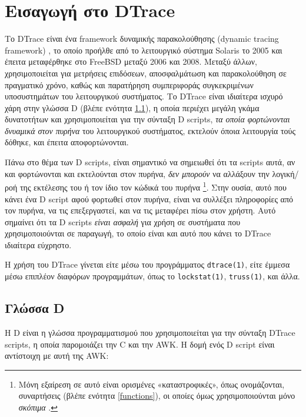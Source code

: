 \documentclass[12pt]{article}
\begin{document}
\section{Εισαγωγή στο DTrace}

Το DTrace \cite{dtracebook} \cite{oracledtrace} \cite{markpres}
\cite{greggdintro} \cite{usenix04} \cite{dinternals} είναι ένα framework
δυναμικής παρακολούθησης (dynamic tracing framework) \cite{tamches}, το οποίο
προήλθε από το λειτουργικό σύστημα Solaris το 2005 και έπειτα μεταφέρθηκε στο
FreeBSD μεταξύ 2006 και 2008. Μεταξύ άλλων, χρησιμοποιείται για μετρήσεις
επιδόσεων, αποσφαλμάτωση και παρακολούθηση σε πραγματικό χρόνο, καθώς και
παρατήρηση συμπεριφοράς συγκεκριμένων υποσυστημάτων του λειτουργικού
συστήματος. Το DTrace είναι ιδιαίτερα ισχυρό χάρη στην γλώσσα D (βλέπε ενότητα
\ref{dlang}), η οποία περιέχει μεγάλη γκάμα δυνατοτήτων και χρησιμοποιείται για
την σύνταξη D scripts, \textit{τα οποία φορτώνονται δνυαμικά στον πυρήνα} του
λειτουργικού συστήματος, εκτελούν όποια λειτουργία τούς δόθηκε, και έπειτα
αποφορτώνονται.

Πάνω στο θέμα των D scripts, είναι σημαντικό να σημειωθεί ότι τα scripts αυτά,
αν και φορτώνονται και εκτελούνται στον πυρήνα, \textit{δεν μπορούν} να
αλλάξουν την λογική/ροή της εκτέλεσης του ή τον ίδιο τον κώδικά του πυρήνα
\footnote{
	Μόνη εξαίρεση σε αυτό είναι ορισμένες «καταστροφικές», όπως
	ονομάζονται, συναρτήσεις (βλέπε ενότητα \ref{functions}), οι οποίες
	όμως χρησιμοποιούνται μόνο \textit{σκόπιμα} .
}.
Στην ουσία, αυτό που κάνει ένα D script αφού φορτωθεί στον πυρήνα, είναι να
συλλέξει πληροφορίες από τον πυρήνα, να τις επεξεργαστεί, και να τις μεταφέρει
πίσω στον χρήστη. Αυτό σημαίνει ότι τα D scripts \textit{είναι ασφαλή} για
χρήση σε συστήματα που χρησιμοποιούνται σε παραγωγή, το οποίο είναι και αυτό
που κάνει το DTrace ιδιαίτερα εύχρηστο.

Η χρήση του DTrace γίνεται είτε μέσω του προγράμματος \lstinline{dtrace(1)},
είτε έμμεσα μέσω επιπλέον διαφόρων προγραμμάτων, όπως το
\lstinline{lockstat(1)}, \lstinline{truss(1)}, και άλλα.

\subsection{Γλώσσα D} \label{dlang}

Η D είναι η γλώσσα προγραμματισμού που χρησιμοποιείται για την σύνταξη DTrace
scripts, η οποία παρομοιάζει την C και την AWK. Η δομή ενός D script είναι
αντίστοιχη με αυτή της AWK:
\end{document}
